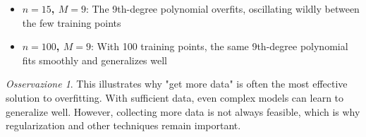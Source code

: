 \documentclass[11pt,a4paper]{article}
\theoremstyle{definition}
\theoremstyle{plain}
\theoremstyle{remark}
\newtheorem*{observation}{Osservazione}
\begin{document}
\begin{itemize}
    \item \textbf{$n = 15$, $M = 9$}: The 9th-degree polynomial overfits, oscillating wildly between the few training points
    \item \textbf{$n = 100$, $M = 9$}: With 100 training points, the same 9th-degree polynomial fits smoothly and generalizes well
\end{itemize}

\begin{observation}
This illustrates why "get more data" is often the most effective solution to overfitting. With sufficient data, even complex models can learn to generalize well. However, collecting more data is not always feasible, which is why regularization and other techniques remain important.
\end{observation}
\end{document}
